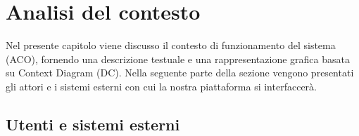 \section{Analisi del contesto}
\label{secD2:AnalisiDelContesto}


Nel presente capitolo viene discusso il contesto di funzionamento del sistema (ACO), fornendo una descrizione testuale e una rappresentazione grafica basata su Context Diagram (DC).
Nella seguente parte della sezione vengono presentati gli attori e i sistemi esterni con cui la nostra piattaforma si interfaccerà.

\subsection{Utenti e sistemi esterni}

